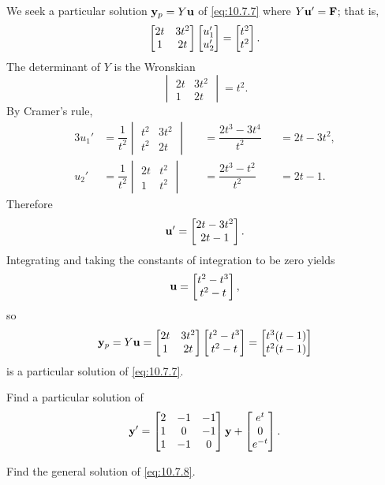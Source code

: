 \begin{solution}
We seek a particular solution $\mathbf{y}_p=Y\mathbf{u}$ of \eqref{eq:10.7.7}
where $Y\mathbf{u}'=\mathbf{F}$; that is,
\[
\begin{bmatrix}2t&3t^2\\1&2t\end{bmatrix}\begin{bmatrix}u_1'\\u_2'\end{bmatrix}
=\begin{bmatrix}t^2\\t^2\end{bmatrix}.
\]
The determinant of $Y$  is the Wronskian
\[
\begin{vmatrix}2t&3t^2\\1&2t\end{vmatrix}=t^2.
\]
By Cramer's rule,
\begin{alignat*}{3}
u_1'
&=\dfrac{1}{t^2}
\begin{vmatrix}t^2&3t^2\\t^2&2t\end{vmatrix}
&&=\dfrac{2t^3-3t^4}{t^2}
&&=2t-3t^2,
\\
u_2'
&=\dfrac{1}{t^2}
\begin{vmatrix}2t&t^2\\1&t^2\end{vmatrix}
&&=\dfrac{2t^3-t^2}{t^2}
&&=2t-1.
\end{alignat*}
Therefore
\[
\mathbf{u}'=\begin{bmatrix}2t-3t^2\\2t-1\end{bmatrix}.
\]
Integrating  and taking the constants of integration to be zero yields
\[
\mathbf{u}=\begin{bmatrix}t^2-t^3\\t^2-t\end{bmatrix},
\]
so
\[
\mathbf{y}_p=Y\mathbf{u}=
\begin{bmatrix}2t&3t^2\\1&2t\end{bmatrix}
\begin{bmatrix}t^2-t^3\\t^2-t\end{bmatrix}
=\begin{bmatrix}t^3(t-1)\\t^2(t-1)\end{bmatrix}
\]
is a particular solution of  \eqref{eq:10.7.7}.
\end{solution}

\begin{example}\label{example:10.7.4}
\begin{alist}
\item %
Find a particular solution of
\begin{equation} \label{eq:10.7.8}
\mathbf{y}'=\begin{bmatrix}2&-1&-1\\1&0&-1\\1&-1&0\end{bmatrix}\mathbf{y}+\begin{bmatrix}e^{t}\\0\\e^{-t}\end{bmatrix}.
\end{equation}
\item %
Find the general solution of  \eqref{eq:10.7.8}.
\end{alist}
\end{example}

